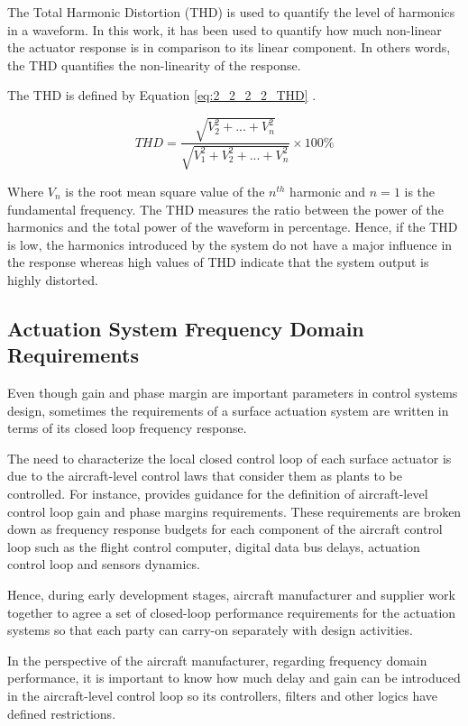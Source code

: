 The Total Harmonic Distortion (THD) is used to quantify the level of harmonics in a waveform. In this work, it has been used to quantify how much non-linear the actuator response is in comparison to its linear component. In others words, the THD quantifies the non-linearity of the response.

The THD is defined by Equation \ref{eq:2_2_2_2_THD} \cite{Doron}.

\begin{equation}
\label{eq:2_2_2_2_THD}
THD = \dfrac{\sqrt{V_2^2+...+V_n^2}}{\sqrt{V_1^2+V_2^2+...+V_n^2}}\times 100\%
\end{equation}

Where $V_n$ is the root mean square value of the $n^{th}$ harmonic and $n=1$ is the fundamental frequency. The THD measures the ratio between the power of the harmonics and the total power of the waveform in percentage. Hence, if the THD is low, the harmonics introduced by the system do not have a major influence in the response whereas high values of THD indicate that the system output is highly distorted.

\subsection{Actuation System Frequency Domain Requirements}

Even though gain and phase margin are important parameters in control systems design, sometimes the requirements of a surface actuation system are written in terms of its closed loop frequency response. 

The need to characterize the local closed control loop of each surface actuator is due to the aircraft-level control laws that consider them as plants to be controlled. For instance,  provides guidance for the definition of aircraft-level control loop gain and phase margins requirements. These requirements are broken down as frequency response budgets for each component of the aircraft control loop such as the flight control computer, digital data bus delays, actuation control loop and sensors dynamics.

Hence, during early development stages, aircraft manufacturer and supplier work together to agree a set of closed-loop performance requirements for the actuation systems so that each party can carry-on separately with design activities.

In the perspective of the aircraft manufacturer, regarding frequency domain performance, it is important to know how much delay and gain can be introduced in the aircraft-level control loop so its controllers, filters and other logics have defined restrictions. 

